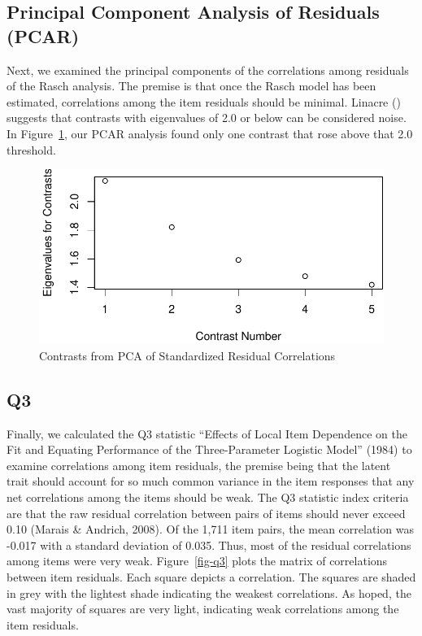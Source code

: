 \documentclass[
  letterpaper,
]{article}
\begin{document}
\hypertarget{principal-component-analysis-of-residuals-pcar}{%
\subsection*{Principal Component Analysis of Residuals
(PCAR)}\label{principal-component-analysis-of-residuals-pcar}}

Next, we examined the principal components of the correlations among
residuals of the Rasch analysis. The premise is that once the Rasch
model has been estimated, correlations among the item residuals should
be minimal. Linacre () suggests that contrasts with eigenvalues of 2.0
or below can be considered noise. In Figure~\ref{fig-pcar}, our PCAR
analysis found only one contrast that rose above that 2.0 threshold.

\begin{figure}

{\centering \includegraphics{./results_files/figure-pdf/fig-pcar-1.pdf}

}

\caption{\label{fig-pcar}Contrasts from PCA of Standardized Residual
Correlations}

\end{figure}

\hypertarget{q3}{%
\subsection*{Q3}\label{q3}}

Finally, we calculated the Q3 statistic {``Effects of Local Item
Dependence on the Fit and Equating Performance of the Three-Parameter
Logistic Model''} (1984) to examine correlations among item residuals,
the premise being that the latent trait should account for so much
common variance in the item responses that any net correlations among
the items should be weak. The Q3 statistic index criteria are that the
raw residual correlation between pairs of items should never exceed 0.10
(Marais \& Andrich, 2008). Of the 1,711 item pairs, the mean correlation
was -0.017 with a standard deviation of 0.035. Thus, most of the
residual correlations among items were very weak. Figure~\ref{fig-q3}
plots the matrix of correlations between item residuals. Each square
depicts a correlation. The squares are shaded in grey with the lightest
shade indicating the weakest correlations. As hoped, the vast majority
of squares are very light, indicating weak correlations among the item
residuals.
\end{document}
